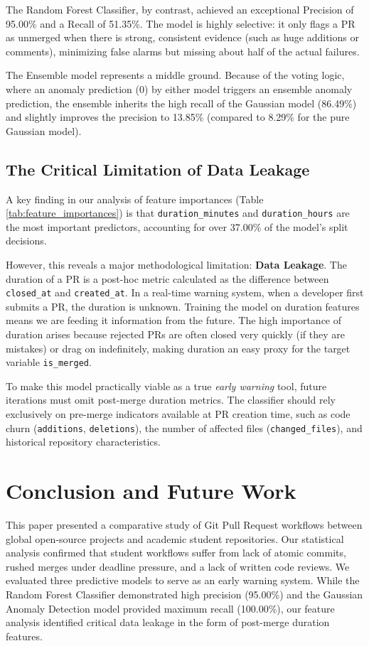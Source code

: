 \documentclass[conference]{IEEEtran}
\begin{document}
The Random Forest Classifier, by contrast, achieved an exceptional Precision of 95.00\% and a Recall of 51.35\%. The model is highly selective: it only flags a PR as unmerged when there is strong, consistent evidence (such as huge additions or comments), minimizing false alarms but missing about half of the actual failures.

The Ensemble model represents a middle ground. Because of the voting logic, where an anomaly prediction (0) by either model triggers an ensemble anomaly prediction, the ensemble inherits the high recall of the Gaussian model (86.49\%) and slightly improves the precision to 13.85\% (compared to 8.29\% for the pure Gaussian model). 

\subsection{The Critical Limitation of Data Leakage}
A key finding in our analysis of feature importances (Table \ref{tab:feature_importances}) is that \texttt{duration\_minutes} and \texttt{duration\_hours} are the most important predictors, accounting for over 37.00\% of the model's split decisions. 

However, this reveals a major methodological limitation: \textbf{Data Leakage}. The duration of a PR is a post-hoc metric calculated as the difference between \texttt{closed\_at} and \texttt{created\_at}. In a real-time warning system, when a developer first submits a PR, the duration is unknown. Training the model on duration features means we are feeding it information from the future. The high importance of duration arises because rejected PRs are often closed very quickly (if they are mistakes) or drag on indefinitely, making duration an easy proxy for the target variable \texttt{is\_merged}.

To make this model practically viable as a true \textit{early warning} tool, future iterations must omit post-merge duration metrics. The classifier should rely exclusively on pre-merge indicators available at PR creation time, such as code churn (\texttt{additions}, \texttt{deletions}), the number of affected files (\texttt{changed\_files}), and historical repository characteristics.

\section{Conclusion and Future Work}
This paper presented a comparative study of Git Pull Request workflows between global open-source projects and academic student repositories. Our statistical analysis confirmed that student workflows suffer from lack of atomic commits, rushed merges under deadline pressure, and a lack of written code reviews. We evaluated three predictive models to serve as an early warning system. While the Random Forest Classifier demonstrated high precision (95.00\%) and the Gaussian Anomaly Detection model provided maximum recall (100.00\%), our feature analysis identified critical data leakage in the form of post-merge duration features.
\end{document}
